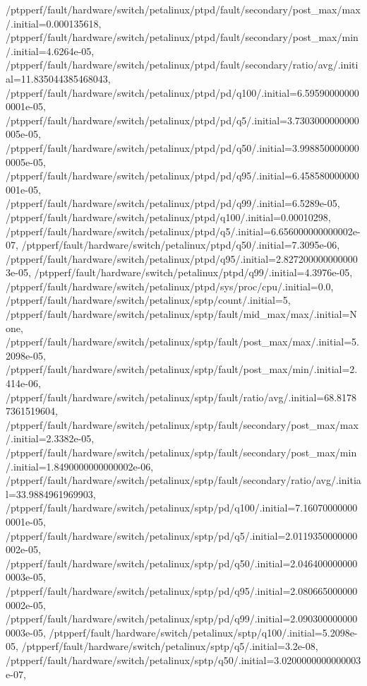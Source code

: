 {    /ptpperf/fault/hardware/switch/petalinux/ptpd/fault/secondary/post_max/max/.initial=0.000135618,
    /ptpperf/fault/hardware/switch/petalinux/ptpd/fault/secondary/post_max/min/.initial=4.6264e-05,
    /ptpperf/fault/hardware/switch/petalinux/ptpd/fault/secondary/ratio/avg/.initial=11.835044385468043,
    /ptpperf/fault/hardware/switch/petalinux/ptpd/pd/q100/.initial=6.595900000000001e-05,
    /ptpperf/fault/hardware/switch/petalinux/ptpd/pd/q5/.initial=3.7303000000000005e-05,
    /ptpperf/fault/hardware/switch/petalinux/ptpd/pd/q50/.initial=3.9988500000000005e-05,
    /ptpperf/fault/hardware/switch/petalinux/ptpd/pd/q95/.initial=6.458580000000001e-05,
    /ptpperf/fault/hardware/switch/petalinux/ptpd/pd/q99/.initial=6.5289e-05,
    /ptpperf/fault/hardware/switch/petalinux/ptpd/q100/.initial=0.00010298,
    /ptpperf/fault/hardware/switch/petalinux/ptpd/q5/.initial=6.656000000000002e-07,
    /ptpperf/fault/hardware/switch/petalinux/ptpd/q50/.initial=7.3095e-06,
    /ptpperf/fault/hardware/switch/petalinux/ptpd/q95/.initial=2.8272000000000003e-05,
    /ptpperf/fault/hardware/switch/petalinux/ptpd/q99/.initial=4.3976e-05,
    /ptpperf/fault/hardware/switch/petalinux/ptpd/sys/proc/cpu/.initial=0.0,
    /ptpperf/fault/hardware/switch/petalinux/sptp/count/.initial=5,
    /ptpperf/fault/hardware/switch/petalinux/sptp/fault/mid_max/max/.initial=None,
    /ptpperf/fault/hardware/switch/petalinux/sptp/fault/post_max/max/.initial=5.2098e-05,
    /ptpperf/fault/hardware/switch/petalinux/sptp/fault/post_max/min/.initial=2.414e-06,
    /ptpperf/fault/hardware/switch/petalinux/sptp/fault/ratio/avg/.initial=68.81787361519604,
    /ptpperf/fault/hardware/switch/petalinux/sptp/fault/secondary/post_max/max/.initial=2.3382e-05,
    /ptpperf/fault/hardware/switch/petalinux/sptp/fault/secondary/post_max/min/.initial=1.8490000000000002e-06,
    /ptpperf/fault/hardware/switch/petalinux/sptp/fault/secondary/ratio/avg/.initial=33.9884961969903,
    /ptpperf/fault/hardware/switch/petalinux/sptp/pd/q100/.initial=7.160700000000001e-05,
    /ptpperf/fault/hardware/switch/petalinux/sptp/pd/q5/.initial=2.0119350000000002e-05,
    /ptpperf/fault/hardware/switch/petalinux/sptp/pd/q50/.initial=2.0464000000000003e-05,
    /ptpperf/fault/hardware/switch/petalinux/sptp/pd/q95/.initial=2.0806650000000002e-05,
    /ptpperf/fault/hardware/switch/petalinux/sptp/pd/q99/.initial=2.0903000000000003e-05,
    /ptpperf/fault/hardware/switch/petalinux/sptp/q100/.initial=5.2098e-05,
    /ptpperf/fault/hardware/switch/petalinux/sptp/q5/.initial=3.2e-08,
    /ptpperf/fault/hardware/switch/petalinux/sptp/q50/.initial=3.0200000000000003e-07,
}
